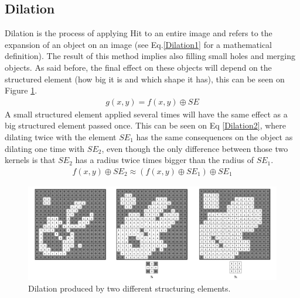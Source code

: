 \subsection{Dilation}
Dilation is the process of applying Hit to an entire image and refers to the expansion of an object on an image (see Eq.\ref{Dilation1} for a mathematical definition). The result of this method implies also filling small holes and merging objects. As said before, the final effect on these objects will depend on the structured element (how big it is and which shape it has), this can be seen on Figure \ref{fig:Dilation}. 
\begin{equation}
\begin{aligned}
{g(x, y)}={f(x,y)}\oplus{SE}
\label{Dilation1}
	\end{aligned}
\end{equation}
A small structured element applied several times will have the same effect as a big structured element passed once. This can be seen on Eq \ref{Dilation2}, where dilating twice with the element {$SE_{1}$} has the same consequences on the object as dilating one time with {$SE_{2}$}, even though the only difference between those two kernels is that {$SE_{2}$} has a radius twice times bigger than the radius of {$SE_{1}$}.
\begin{equation}
\begin{aligned}
{f(x,y)}\oplus{SE_{2}} \approx ({f(x,y)}\oplus{SE_{1}})\oplus{SE_{1}}
\label{Dilation2}
	\end{aligned}
\end{equation}
\begin{figure}[htbp]
\centering
\includegraphics[width=1\textwidth]{Pictures/Theory/Dilation.png}
\caption{Dilation produced by two different structuring elements.}
\label{fig:Dilation}
\end{figure}

